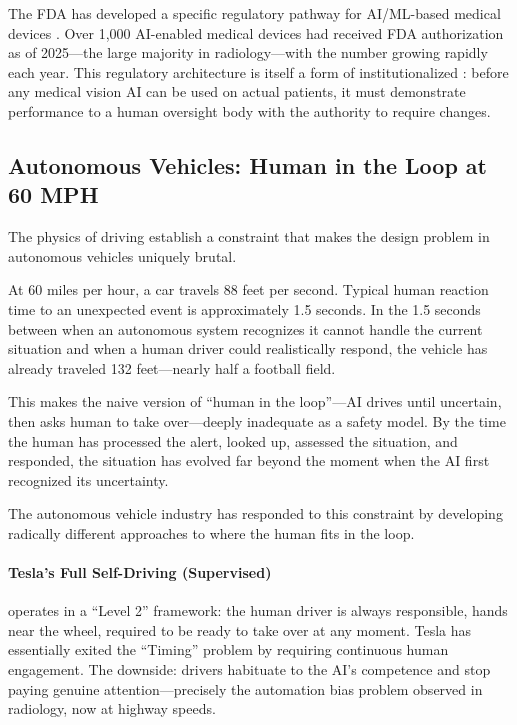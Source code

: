 The FDA has developed a specific regulatory pathway for AI/ML-based medical devices \autocite{fda2021samed}. Over 1,000 AI-enabled medical devices had received FDA authorization as of 2025---the large majority in radiology---with the number growing rapidly each year. This regulatory architecture is itself a form of institutionalized \hitl: before any medical vision AI can be used on actual patients, it must demonstrate performance to a human oversight body with the authority to require changes.

\subsection{Autonomous Vehicles: Human in the Loop at 60 MPH}

The physics of driving establish a constraint that makes the \hitl design problem in autonomous vehicles uniquely brutal.

At 60 miles per hour, a car travels 88 feet per second. Typical human reaction time to an unexpected event is approximately 1.5 seconds. In the 1.5 seconds between when an autonomous system recognizes it cannot handle the current situation and when a human driver could realistically respond, the vehicle has already traveled 132 feet---nearly half a football field.

This makes the naive version of ``human in the loop''---AI drives until uncertain, then asks human to take over---deeply inadequate as a safety model. By the time the human has processed the alert, looked up, assessed the situation, and responded, the situation has evolved far beyond the moment when the AI first recognized its uncertainty.

The autonomous vehicle industry has responded to this constraint by developing radically different approaches to where the human fits in the loop.

\paragraph{Tesla's Full Self-Driving (Supervised)} operates in a ``Level 2'' framework: the human driver is always responsible, hands near the wheel, required to be ready to take over at any moment. Tesla has essentially exited the ``Timing'' problem by requiring continuous human engagement. The downside: drivers habituate to the AI's competence and stop paying genuine attention---precisely the automation bias problem observed in radiology, now at highway speeds.

